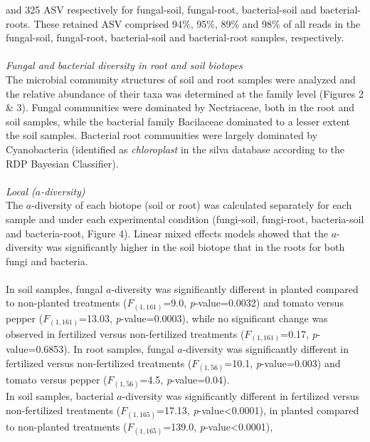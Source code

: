 \documentclass[12pt,]{article}
\begin{document}
and 325 ASV respectively for fungal-soil, fungal-root, bacterial-soil
and bacterial-roots. These retained ASV comprised 94\%, 95\%, 89\% and
98\% of all reads in the fungal-soil, fungal-root, bacterial-soil and
bacterial-root samples, respectively.\\
\hspace*{0.333em}\\
\emph{Fungal and bacterial diversity in root and soil biotopes}\\
The microbial community structures of soil and root samples were
analyzed and the relative abundance of their taxa was determined at the
family level (Figures 2 \& 3). Fungal communities were dominated by
Nectriaceae, both in the root and soil samples, while the bacterial
family Bacilaceae dominated to a lesser extent the soil samples.
Bacterial root communities were largely dominated by Cyanobacteria
(identified as \emph{chloroplast} in the silva database according to the
RDP Bayesian Classifier).\\
\hspace*{0.333em}\\
\emph{Local (\(a\)-diversity)}\\
The \(a\)-diversity of each biotope (soil or root) was calculated
separately for each sample and under each experimental condition
(fungi-soil, fungi-root, bacteria-soil and bacteria-root, Figure 4).
Linear mixed effects models showed that the \(a\)-diversity was
significantly higher in the soil biotope that in the roots for both
fungi and bacteria.\\
\hspace*{0.333em}\\
In soil samples, fungal \(a\)-diversity was significantly different in
planted compared to non-planted treatments (\(F_{(1,161)}\)=9.0,
\emph{p}-value=0.0032) and tomato versus pepper (\(F_{(1,161)}\)=13.03,
\emph{p}-value=0.0003), while no significant change was observed in
fertilized versus non-fertilized treatments (\(F_{(1,161)}\)=0.17,
\emph{p}-value=0.6853). In root samples, fungal \(a\)-diversity was
significantly different in fertilized versus non-fertilized treatments
(\(F_{(1,56)}\)=10.1, \emph{p}-value=0.003) and tomato versus pepper
(\(F_{(1,56)}\)=4.5, \emph{p}-value=0.04). ~\\
In soil samples, bacterial \(a\)-diversity was significantly different
in fertilized versus non-fertilized treatments (\(F_{(1,165)}\)=17.13,
\emph{p}-value\textless{}0.0001), in planted compared to non-planted
treatments (\(F_{(1,165)}\)=139.0, \emph{p}-value\textless{}0.0001),
\end{document}

